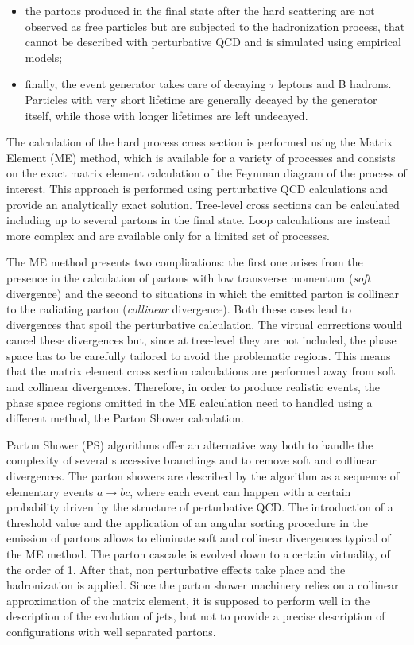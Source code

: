 \begin{itemize}
\item the partons produced in the final state after the hard scattering are not observed as free particles but are subjected to the hadronization process, that cannot be described with perturbative QCD and is simulated using empirical models;

\item finally, the event generator takes care of decaying $\tau$ leptons and B hadrons. Particles with very short lifetime are generally decayed by the generator itself, while those with longer lifetimes are left undecayed.
\end{itemize}

The calculation of the hard process cross section is performed using the Matrix Element (ME) method, which is available for a variety of processes and consists on the exact matrix element calculation of the Feynman diagram of the process of interest. This approach is performed using perturbative QCD calculations and provide an analytically exact solution. Tree-level cross sections can be calculated including up to several partons in the final state. Loop calculations are instead more complex and are available only for a limited set of processes. 

The ME method presents two complications: the first one arises from the presence in the calculation of partons with low transverse momentum (\emph{soft} divergence) and the second to situations in which the emitted parton is collinear to the radiating parton (\emph{collinear} divergence). Both these cases lead to divergences that spoil the perturbative calculation. The virtual corrections would cancel these divergences but, since at tree-level they are not included, the phase space has to be carefully tailored to avoid the problematic regions. This means that the matrix
element cross section calculations are performed away from soft and collinear divergences. Therefore, in order to produce realistic events, the phase space regions omitted in the ME calculation need to handled using a different method, the Parton Shower calculation.

Parton Shower (PS) algorithms offer an alternative way both to handle the complexity of several successive branchings and to remove soft and collinear divergences. The parton showers are described by the algorithm as a sequence of elementary events $a\to bc$, where each event can happen with a certain probability driven by the structure of perturbative QCD. The introduction of a threshold value
and the application of an angular sorting procedure in the emission of partons allows to eliminate soft and collinear divergences typical of the ME method. The parton cascade is evolved down to a certain virtuality, of the order of 1\GeV. After that, non perturbative effects take place and the hadronization is applied. Since the parton shower machinery relies on a collinear approximation of the matrix element, it is supposed to perform well in the description of the evolution of jets, but not to provide a precise description of configurations with well separated partons.

